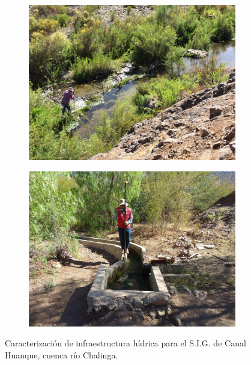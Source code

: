 \documentclass[]{article}
\begin{document}
\begin{figure}[H]
  \centering
\begin{subfigure}{.45\textwidth}
\hfill
  \includegraphics[angle= 180, width=\textwidth]{Foto/h1.jpg}
\end{subfigure}
\hfill
\begin{subfigure}{.45\textwidth}
\hfill
  \includegraphics[width=\textwidth]{Foto/h2.jpg} 
\end{subfigure}
\caption{Caracterización de infraestructura hídrica para el S.I.G. de Canal Huanque, cuenca río Chalinga.}
\end{figure}
\end{document}
